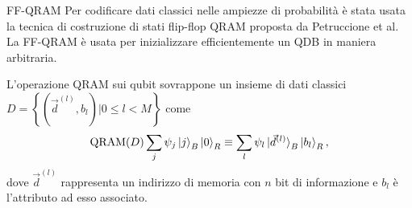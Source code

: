 \documentclass{beamer}
\begin{document}
    \begin{frame}{FF-QRAM}
        Per codificare dati classici nelle ampiezze di probabilità è stata usata la tecnica di costruzione 
        di stati flip-flop QRAM proposta da Petruccione et al. \cite{petruccione}
        La FF-QRAM è usata per inizializzare efficientemente un QDB in maniera arbitraria. 

        L'operazione QRAM sui qubit sovrappone un insieme di dati classici 
        $D = \left\{ \left( \vec{d}^{(l)}, b_l \right) \Big| 0 \leq l < M \right\}$ come
        \begin{equation*} \label{eq:qram}
            \text{QRAM}(D) \sum_j \psi_j \ket{j}_B \ket{0}_R \equiv 
            \sum_l \psi_l \ket{\vec{d}^{(l)}}_B \ket{b_l}_R,
        \end{equation*}
        dove $\vec{d}^{(l)}$ rappresenta un indirizzo di memoria con 
        $n$ bit di informazione 
        e $b_l$ è l'attributo ad esso associato. 
    \end{frame}
\end{document}
